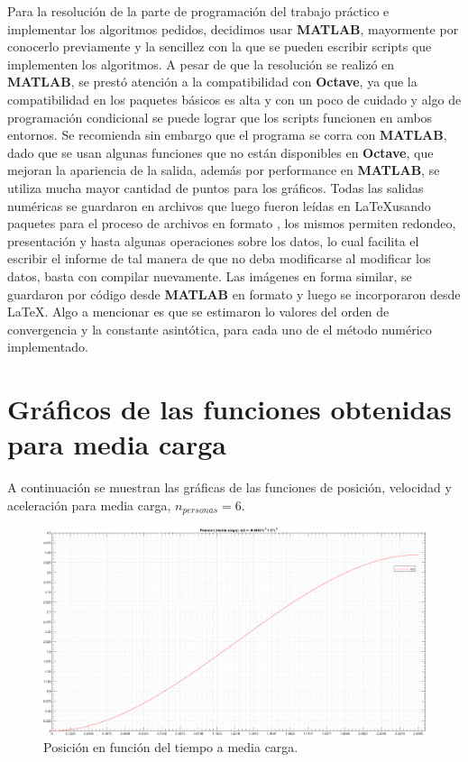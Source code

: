 Para la resolución de la parte de programación del trabajo práctico e implementar los algoritmos pedidos, decidimos usar \textbf{MATLAB}, mayormente por conocerlo previamente y la sencillez con la que se pueden escribir scripts que implementen los algoritmos. A pesar de que la resolución se realizó en \textbf{MATLAB}, se prestó atención a la compatibilidad con \textbf{Octave}, ya que la compatibilidad en los paquetes básicos es alta y con un poco de cuidado y algo de programación condicional se puede lograr que los scripts funcionen en ambos entornos. Se recomienda sin embargo que el programa se corra con \textbf{MATLAB}, dado que se usan algunas funciones que no están disponibles en \textbf{Octave}, que mejoran la apariencia de la salida, además por performance en \textbf{MATLAB}, se utiliza mucha mayor cantidad de puntos para los gráficos.
Todas las salidas numéricas se guardaron en archivos que luego fueron leídas en \LaTeX\space usando paquetes para el proceso de archivos en formato \textbf{}, los mismos permiten redondeo, presentación y hasta algunas operaciones sobre los datos, lo cual facilita el escribir el informe de tal manera de que no deba modificarse al modificar los datos, basta con compilar nuevamente. Las imágenes en forma similar, se guardaron por código desde \textbf{MATLAB} en formato \textbf{} y luego se incorporaron desde \LaTeX. Algo a mencionar es que se estimaron lo valores del orden de convergencia y la constante asintótica, para cada uno de el método numérico implementado.





\section{Gráficos de las funciones obtenidas para media carga}

A continuación se muestran las gráficas de las funciones de posición, velocidad y aceleración para media carga, $n_{personas} = 6$.


\begin{figure}[!h] %
\begin{center}
\includegraphics[width=1.2 \textwidth, keepaspectratio=true, angle=90]{img/grafico_funcion_x.png} %
\caption{\label{fig:fig_position_n_2} \footnotesize{Posición en función del tiempo a media carga.}}
\end{center}
\end{figure}


